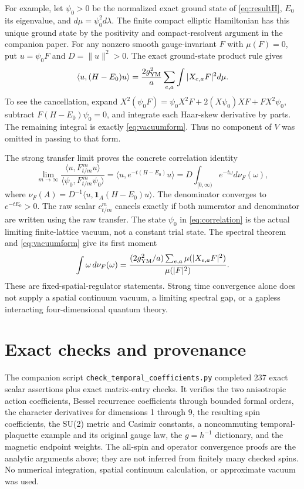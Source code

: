 \documentclass[11pt]{article}
\begin{document}
For example, let $\psi_0>0$ be the normalized exact ground state of
\eqref{eq:resultH}, $E_0$ its eigenvalue, and $d\mu=\psi_0^2d\lambda$.
The finite compact elliptic Hamiltonian has this unique ground state
by the positivity and compact-resolvent argument in the companion
paper. For any nonzero smooth gauge-invariant $F$ with $\mu(F)=0$, put
$u=\psi_0F$ and $D=\|u\|^2>0$. The exact ground-state product rule gives
\begin{equation}\label{eq:vacuumform}
 \langle u,(H-E_0)u\rangle
 =\frac{2g_{\rm YM}^2}{a}\sum_{e,a}\int|X_{e,a}F|^2d\mu.
\end{equation}
To see the cancellation, expand
$X^2(\psi_0F)=\psi_0X^2F+2(X\psi_0)XF+F X^2\psi_0$,
subtract $F(H-E_0)\psi_0=0$, and integrate each Haar-skew derivative
by parts. The remaining integral is exactly \eqref{eq:vacuumform}.
Thus no component of $V$ was omitted in passing to that form.

The strong transfer limit proves the concrete correlation identity
\begin{equation}\label{eq:correlation}
 \lim_{m\to\infty}
 \frac{\langle u,F_{t/m}^{\,m}u\rangle}
      {\langle\psi_0,F_{t/m}^{\,m}\psi_0\rangle}
 =\langle u,e^{-t(H-E_0)}u\rangle
 =D\int_{[0,\infty)}e^{-t\omega}d\nu_F(\omega),
\end{equation}
where $\nu_F(A)=D^{-1}\langle u,\mathbf1_A(H-E_0)u\rangle$.
The denominator converges to $e^{-tE_0}>0$. The raw scalar
$c_{t/m}^m$ cancels exactly if both numerator and denominator are
written using the raw transfer. The state $\psi_0$ in
\eqref{eq:correlation} is the actual limiting finite-lattice vacuum,
not a constant trial state. The spectral theorem and
\eqref{eq:vacuumform} give its first moment
\[
 \int\omega\,d\nu_F(\omega)
 =\frac{(2g_{\rm YM}^2/a)\sum_{e,a}\mu(|X_{e,a}F|^2)}{\mu(|F|^2)}.
\]
These are fixed-spatial-regulator statements. Strong time convergence
alone does not supply a spatial continuum vacuum, a limiting spectral
gap, or a gapless interacting four-dimensional quantum theory.

\section{Exact checks and provenance}

The companion script \texttt{check\_temporal\_coefficients.py} completed
237 exact scalar assertions plus exact matrix-entry checks. It verifies
the two anisotropic action coefficients, Bessel recurrence coefficients
through bounded formal orders, the character derivatives for dimensions
1 through 9, the resulting spin coefficients, the SU(2) metric and
Casimir constants, a noncommuting temporal-plaquette example and its
original gauge law, the $g=h^{-1}$ dictionary, and the magnetic endpoint
weights. The all-spin and operator convergence proofs are the analytic
arguments above; they are not inferred from finitely many checked spins.
No numerical integration, spatial continuum calculation, or approximate
vacuum was used.
\end{document}
